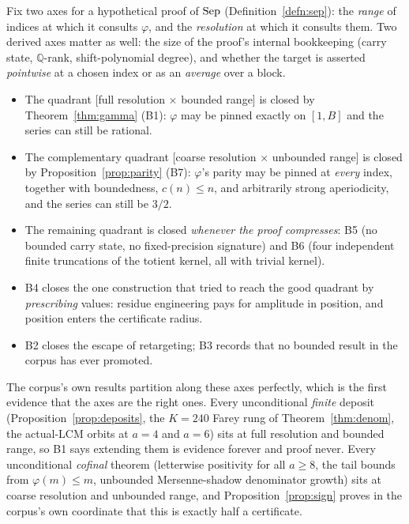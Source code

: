 \documentclass[11pt]{article}
\theoremstyle{plain}
\theoremstyle{definition}
\theoremstyle{remark}
\let\origmathrm\mathrm
\renewcommand{\mathrm}[1]{\ifmmode\origmathrm{#1}\else\textrm{#1}\fi}%
\newcommand{\Q}{\mathbb{Q}}
\begin{document}
Fix two axes for a hypothetical proof of $\mathrm{Sep}$
(Definition~\ref{defn:sep}): the \emph{range} of indices at which it consults
$\varphi$, and the \emph{resolution} at which it consults them. Two derived
axes matter as well: the size of the proof's internal bookkeeping (carry
state, $\Q$-rank, shift-polynomial degree), and whether the target is asserted
\emph{pointwise} at a chosen index or as an \emph{average} over a block.

\begin{itemize}[leftmargin=*]
\item The quadrant [full resolution $\times$ bounded range] is closed by
  Theorem~\ref{thm:gamma} (B1): $\varphi$ may be pinned exactly on $[1,B]$ and
  the series can still be rational.
\item The complementary quadrant [coarse resolution $\times$ unbounded range]
  is closed by Proposition~\ref{prop:parity} (B7): $\varphi$'s parity may be
  pinned at \emph{every} index, together with boundedness, $c(n) \le n$, and
  arbitrarily strong aperiodicity, and the series can still be $3/2$.
\item The remaining quadrant is closed \emph{whenever the proof compresses}:
  B5 (no bounded carry state, no fixed-precision signature) and B6 (four
  independent finite truncations of the totient kernel, all with trivial
  kernel).
\item B4 closes the one construction that tried to reach the good quadrant by
  \emph{prescribing} values: residue engineering pays for amplitude in
  position, and position enters the certificate radius.
\item B2 closes the escape of retargeting; B3 records that no bounded result
  in the corpus has ever promoted.
\end{itemize}

The corpus's own results partition along these axes perfectly, which is the
first evidence that the axes are the right ones. Every unconditional
\emph{finite} deposit (Proposition~\ref{prop:deposits}, the $K=240$ Farey rung
of Theorem~\ref{thm:denom}, the actual-LCM orbits at $a = 4$ and $a = 6$) sits
at full resolution and bounded range, so B1 says extending them is evidence
forever and proof never. Every unconditional \emph{cofinal} theorem (letterwise
positivity for all $a \ge 8$, the tail bounds from $\varphi(m) \le m$,
unbounded Mersenne-shadow denominator growth) sits at coarse resolution and
unbounded range, and Proposition~\ref{prop:sign} proves in the corpus's own
coordinate that this is exactly half a certificate.
\end{document}
